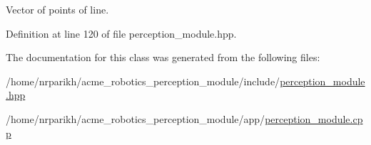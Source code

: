 Vector of points of line. 



Definition at line 120 of file perception\+\_\+module.\+hpp.



The documentation for this class was generated from the following files\+:\begin{DoxyCompactItemize}
\item 
/home/nrparikh/acme\+\_\+robotics\+\_\+perception\+\_\+module/include/\hyperlink{perception__module_8hpp}{perception\+\_\+module.\+hpp}\item 
/home/nrparikh/acme\+\_\+robotics\+\_\+perception\+\_\+module/app/\hyperlink{perception__module_8cpp}{perception\+\_\+module.\+cpp}\end{DoxyCompactItemize}
